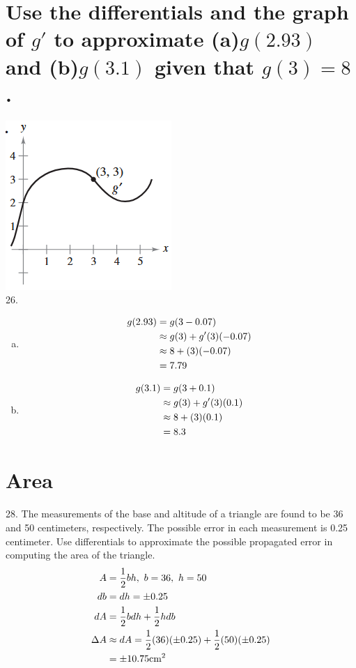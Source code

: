 \documentclass[11pt]{article}
\newcommand*{\set}{\setcounter{equation}{0}}
\begin{document}
\section{Use the differentials and the graph of $g'$ to approximate (a)$g(2.93)$ and (b)$g(3.1)$ given that $g(3)=8$.}
\includegraphics{26.png}\\
26.\begin{enumerate}[(a)]
    \item
        \begin{align}
        \set
        g(2.93)&=g(3-0.07)\\
        &\approx g(3)+g'(3)(-0.07)\\
        &\approx 8+(3)(-0.07)\\
        &=7.79
        \end{align}
    \item 
        \begin{align}
        \set
        g(3.1)&=g(3+0.1)\\
        &\approx g(3)+g'(3)(0.1)\\
        &\approx 8+(3)(0.1)\\
        &=8.3
        \end{align}
\end{enumerate}

\section{Area}
28. The measurements of the base and altitude of a triangle are found to be 36 and 50 centimeters, respectively. The possible error in each measurement is 0.25 centimeter. Use differentials to approximate the possible propagated error in computing the area of the triangle.
\begin{align}
    \set
    A&=\frac{1}{2}bh,\,\, b=36,\,\, h=50\\
    db&=dh=\pm 0.25\\
    dA&=\frac{1}{2}bdh+\frac{1}{2}hdb\\
    \Delta A&\approx dA=\frac{1}{2}(36)(\pm 0.25)+\frac{1}{2}(50)(\pm 0.25)\\
    &=\pm 10.75\text{cm}^2
\end{align}
\end{document}
